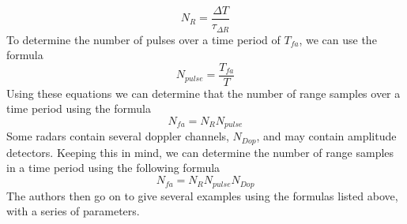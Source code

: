 \documentclass[12pt]{article}
\begin{document}
\begin{equation}
    N_R = \frac{\Delta T}{\tau_{\Delta R}}
\end{equation}
To determine the number of pulses over a time period of $T_{fa}$, we can use the formula 
\begin{equation}
    N_{pulse} = \frac{T_{fa}}{T}
\end{equation}
Using these equations we can determine that the number of range samples over a time period using the formula
\begin{equation}
    N_{fa} = N_R N_{pulse}
\end{equation}
Some radars contain several doppler channels, $N_{Dop}$, and may contain amplitude detectors. Keeping this in mind, we can determine the number of range samples in a time period using the following formula
\begin{equation}
    N_{fa} = N_R N_{pulse} N_{Dop}
\end{equation}
The authors then go on to give several examples using the formulas listed above, with a series of parameters. 

\end{document}
